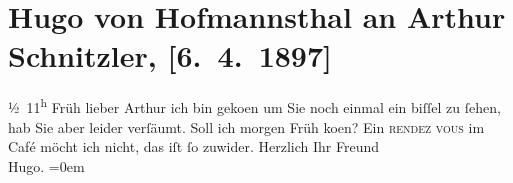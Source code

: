 

         \renewcommand{\erwaehnteOrte}{Orte: Wien}
         \renewcommand{\erwaehnteWerke}{}
               \section[Hugo von Hofmannsthal an Arthur Schnitzler, {[}6. 4. 1897{]}]{ Hugo von Hofmannsthal an Arthur Schnitzler, {[}6. 4. 1897{]}}\nopagebreak{}\rehead{ }\begin{ledgroupsized}[t]{13cm}\normalsize\beginnumbering \toendnotes[C]{\smallbreak\pagebreak[2]} 
\pstart
           \raggedleft{}{\pb}½ 11\textsuperscript{h} Früh\pend
           \pstart{}lieber Arthur\pend\pstart
           ich bin geko{\geminationm}en um Sie noch einmal ein biſſel zu
                    ſehen, hab Sie aber leider verſäumt.\pend
           \pstart
           Soll ich morgen Früh ko{\geminationm}en? Ein \textsc{rendez vous} im Café möcht ich nicht, das iſt ſo zuwider.\pend
           \pstart
           Herzlich Ihr Freund{\\[\baselineskip]}\spacefill\mbox{Hugo.}\pend
           \leftskip=0em{}
         
         \endnumbering{}\end{ledgroupsized}  \newcommand{\dateiname}{L00664}\newcommand{\titel}{Hugo von Hofmannsthal an Arthur Schnitzler, [6. 4. 1897]}\newcommand{\editorInnen}{Martin Anton Müller und Gerd-Hermann Susen}
      